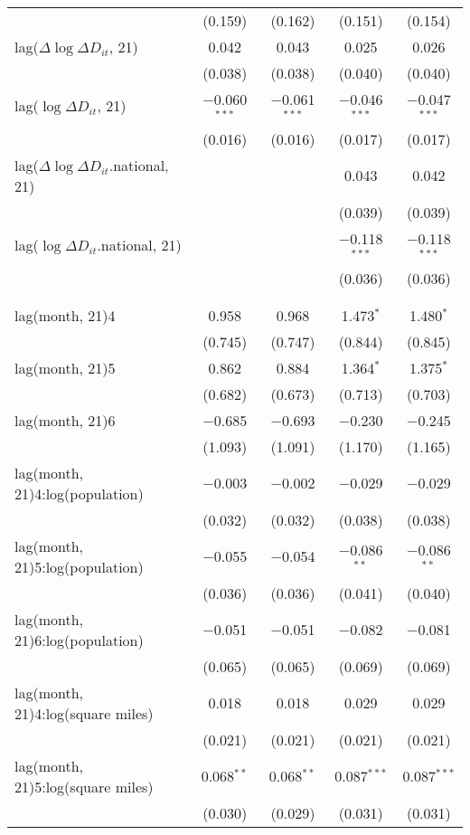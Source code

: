 \begin{tabular}{@{\extracolsep{1pt}}lcccc}
  & (0.159) & (0.162) & (0.151) & (0.154) \\ 
  lag($\Delta \log \Delta D_{it}$, 21) & 0.042 & 0.043 & 0.025 & 0.026 \\ 
  & (0.038) & (0.038) & (0.040) & (0.040) \\ 
  lag($\log \Delta D_{it}$, 21) & $-$0.060$^{***}$ & $-$0.061$^{***}$ & $-$0.046$^{***}$ & $-$0.047$^{***}$ \\ 
  & (0.016) & (0.016) & (0.017) & (0.017) \\ 
  lag($\Delta \log \Delta D_{it}$.national, 21) &  &  & 0.043 & 0.042 \\ 
  &  &  & (0.039) & (0.039) \\ 
  lag($\log \Delta D_{it}$.national, 21) &  &  & $-$0.118$^{***}$ & $-$0.118$^{***}$ \\ 
  &  &  & (0.036) & (0.036) \\ 
   &  &  &  &  \\ 
  &  &  &  &  \\ 
  lag(month, 21)4 & 0.958 & 0.968 & 1.473$^{*}$ & 1.480$^{*}$ \\ 
  & (0.745) & (0.747) & (0.844) & (0.845) \\ 
  lag(month, 21)5 & 0.862 & 0.884 & 1.364$^{*}$ & 1.375$^{*}$ \\ 
  & (0.682) & (0.673) & (0.713) & (0.703) \\ 
  lag(month, 21)6 & $-$0.685 & $-$0.693 & $-$0.230 & $-$0.245 \\ 
  & (1.093) & (1.091) & (1.170) & (1.165) \\ 
  lag(month, 21)4:log(population) & $-$0.003 & $-$0.002 & $-$0.029 & $-$0.029 \\ 
  & (0.032) & (0.032) & (0.038) & (0.038) \\ 
  lag(month, 21)5:log(population) & $-$0.055 & $-$0.054 & $-$0.086$^{**}$ & $-$0.086$^{**}$ \\ 
  & (0.036) & (0.036) & (0.041) & (0.040) \\ 
  lag(month, 21)6:log(population) & $-$0.051 & $-$0.051 & $-$0.082 & $-$0.081 \\ 
  & (0.065) & (0.065) & (0.069) & (0.069) \\ 
  lag(month, 21)4:log(square miles) & 0.018 & 0.018 & 0.029 & 0.029 \\ 
  & (0.021) & (0.021) & (0.021) & (0.021) \\ 
  lag(month, 21)5:log(square miles) & 0.068$^{**}$ & 0.068$^{**}$ & 0.087$^{***}$ & 0.087$^{***}$ \\ 
  & (0.030) & (0.029) & (0.031) & (0.031) \\ 

\end{tabular}
